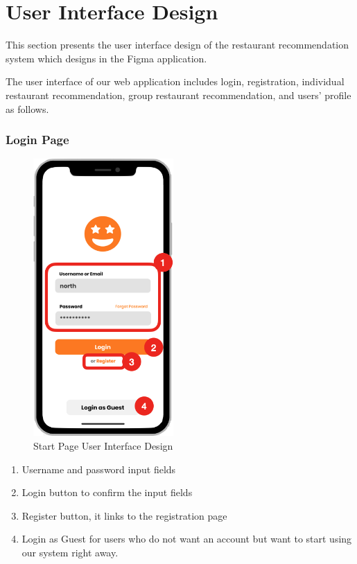 \documentclass[12pt,oneside,openright,a4paper]{cpe-english-project}
\begin{document}
\section{User Interface Design}
This section presents the user interface design of the restaurant recommendation system which designs in the Figma application.

The user interface of our web application includes login, registration, individual restaurant recommendation, group restaurant recommendation, and users’ profile as follows.

\newpage
\subsubsection{Login Page}
\begin{figure}[H]\centering
\includegraphics[height=300pt]{./images/3ui_StartPageUserInterfaceDesign.png}
\caption{Start Page User Interface Design}\label{fig:3ui_StartPageUserInterfaceDesign}
\end{figure}

\begin{enumerate}
\item Username and password input fields
\item Login button to confirm the input fields
\item Register button, it links to the registration page
\item Login as Guest for users who do not want an account but want to start using our system right away.
\end{enumerate}
\end{document}
